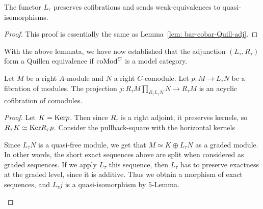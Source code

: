 \documentclass[../thesis.tex]{subfiles}
\begin{document}
            \begin{lemma}
                The functor $L_\tau$ preserves cofibrations and sends weak-equivalences to quasi-isomorphisms.
            \end{lemma}

            \begin{proof}
                This proof is essentially the same as Lemma~\ref{lem: bar-cobar-Quill-adj}.
            \end{proof}

            With the above lemmata, we have now established that the adjunction $(L_\tau, R_\tau)$ form a Quillen equivalence if $\tt{coMod}^C$ is a model category.

            \begin{lemma}
                Let $M$ be a right $A$-module and $N$ a right $C$-comodule. Let $p : M \rightarrow L_\tau N$ be a fibration of modules. The projection $j : R_\tau M \prod_{R_\tau L_\tau N} N \rightarrow R_\tau M$ is an acyclic cofibration of comodules.
            \end{lemma}

            \begin{proof}
                Let $K = \tt{Ker}p$. Then since $R_\tau$ is a right adjoint, it preserves kernels, so $R_\tau K \simeq \tt{Ker}R_\tau p$. Consider the pullback-square with the horizontal kernels
                \begin{center}
                \end{center}

                Since $L_\tau N$ is a quasi-free module, we get that $M \simeq K \oplus L_\tau N$ as a graded module. In other words, the short exact sequences above are split when considered as graded sequences. If we apply $L_\tau$ this sequence, then $L_\tau$ has to preserve exactness at the graded level, since it is additive. Thus we obtain a morphism of exact sequences, and $L_\tau j$ is a quasi-isomorphism by $5$-Lemma.
                \begin{center}
                \end{center}
            \end{proof}
\end{document}
